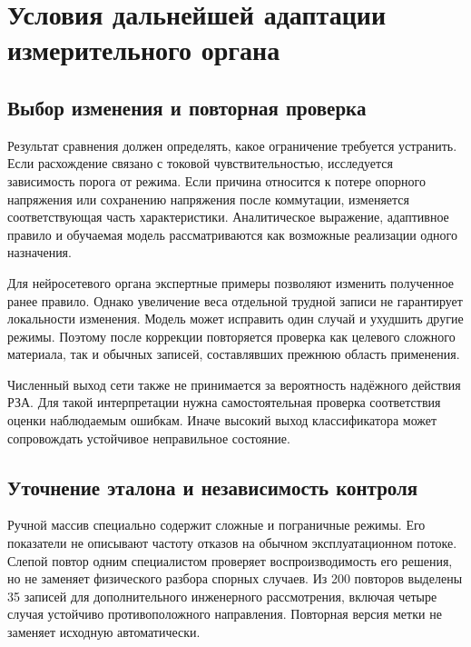 \section{Условия дальнейшей адаптации измерительного органа}
\label{sec:ch5_adaptation_limits}

\subsection{Выбор изменения и повторная проверка}


Результат сравнения должен определять,
какое ограничение требуется устранить.
Если расхождение связано с токовой чувствительностью,
исследуется зависимость порога от режима.
Если причина относится к потере опорного напряжения
или сохранению напряжения после коммутации,
изменяется соответствующая часть характеристики.
Аналитическое выражение, адаптивное правило
и обучаемая модель рассматриваются
как возможные реализации одного назначения.

Для нейросетевого органа экспертные примеры
позволяют изменить полученное ранее правило.
Однако увеличение веса отдельной трудной записи
не гарантирует локальности изменения.
Модель может исправить один случай
и ухудшить другие режимы.
Поэтому после коррекции повторяется проверка
как целевого сложного материала,
так и обычных записей, составлявших прежнюю область применения.

Численный выход сети также не принимается
за вероятность надёжного действия РЗА.
Для такой интерпретации нужна самостоятельная проверка
соответствия оценки наблюдаемым ошибкам.
Иначе высокий выход классификатора
может сопровождать устойчивое неправильное состояние.

\subsection{Уточнение эталона и независимость контроля}

Ручной массив специально содержит сложные
и пограничные режимы.
Его показатели не описывают частоту отказов
на обычном эксплуатационном потоке.
Слепой повтор одним специалистом
проверяет воспроизводимость его решения,
но не заменяет физического разбора спорных случаев.
Из 200 повторов выделены 35 записей
для дополнительного инженерного рассмотрения,
включая четыре случая устойчиво противоположного направления.
Повторная версия метки не заменяет исходную автоматически.

